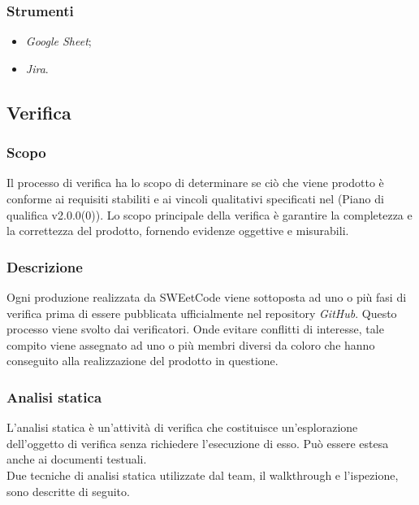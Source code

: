 \documentclass[10pt, a4paper]{article}
\begin{document}
\subsubsection{Strumenti}
\begin{itemize}
    \item \textit{Google Sheet};
    \item \textit{Jira}.
\end{itemize}

\subsection{Verifica}
\subsubsection{Scopo}
Il processo di verifica ha lo scopo di determinare se ciò che viene prodotto è conforme ai requisiti stabiliti e ai vincoli qualitativi specificati nel (Piano di qualifica v2.0.0(0)).
Lo scopo principale della verifica è garantire la completezza e la correttezza del prodotto, fornendo evidenze oggettive e misurabili.

\subsubsection{Descrizione}
Ogni produzione realizzata da SWEetCode viene sottoposta ad uno o più fasi di verifica prima di essere pubblicata ufficialmente nel repository \textit{GitHub}.
Questo processo viene svolto dai verificatori. Onde evitare conflitti di interesse, tale compito viene assegnato ad uno o più membri diversi da coloro che hanno conseguito alla realizzazione del prodotto in questione.

\subsubsection{Analisi statica}
L'analisi statica è un'attività di verifica che costituisce un'esplorazione dell'oggetto di verifica senza richiedere l'esecuzione di esso. Può essere estesa anche ai documenti testuali.\\
Due tecniche di analisi statica utilizzate dal team, il walkthrough e l'ispezione, sono descritte di seguito.
\end{document}
